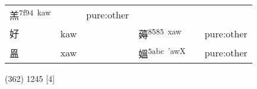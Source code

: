 \documentclass[14pt,a4paper]{scrartcl}
\begin{document}
\begin{longtable}[c]{@{}llllll@{}}
\begin{minipage}[t]{0.14\columnwidth}
羔\textsuperscript{7f94~kaw}
\strut\end{minipage} &
\begin{minipage}[t]{0.14\columnwidth}\raggedright\strut
\strut\end{minipage} &
\begin{minipage}[t]{0.14\columnwidth}\raggedright\strut
pure:other
\strut\end{minipage}\tabularnewline
\begin{minipage}[t]{0.14\columnwidth}\raggedright\strut
好
\strut\end{minipage} &
\begin{minipage}[t]{0.14\columnwidth}\raggedright\strut
kaw
\strut\end{minipage} &
\begin{minipage}[t]{0.14\columnwidth}\raggedright\strut
\strut\end{minipage} &
\begin{minipage}[t]{0.14\columnwidth}\raggedright\strut
薅\textsuperscript{8585~xaw}
\strut\end{minipage} &
\begin{minipage}[t]{0.14\columnwidth}\raggedright\strut
\strut\end{minipage} &
\begin{minipage}[t]{0.14\columnwidth}\raggedright\strut
pure:other
\strut\end{minipage}\tabularnewline
\begin{minipage}[t]{0.14\columnwidth}\raggedright\strut
𥁕
\strut\end{minipage} &
\begin{minipage}[t]{0.14\columnwidth}\raggedright\strut
xaw
\strut\end{minipage} &
\begin{minipage}[t]{0.14\columnwidth}\raggedright\strut
\strut\end{minipage} &
\begin{minipage}[t]{0.14\columnwidth}\raggedright\strut
媼\textsuperscript{5abc~'awX}
\strut\end{minipage} &
\begin{minipage}[t]{0.14\columnwidth}\raggedright\strut
\strut\end{minipage} &
\begin{minipage}[t]{0.14\columnwidth}\raggedright\strut
pure:other
\strut\end{minipage}\tabularnewline
\bottomrule
\end{longtable}

(362) 1245 {[}4{]}
\end{document}
